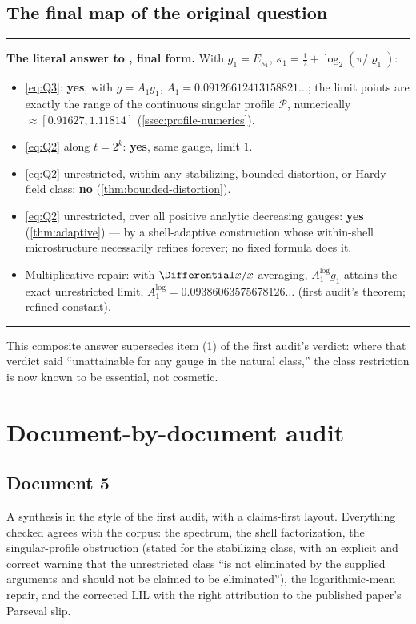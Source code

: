\documentclass[11pt,oneside]{article}
\theoremstyle{definition}
\theoremstyle{remark}
\newenvironment{boxedremark}{%
  \par\smallskip\noindent\begin{center}\begin{minipage}{0.94\textwidth}%
  \color{black}\hrule\vspace{0.6em}\small
}{%
  \vspace{0.6em}\hrule\end{minipage}\end{center}\smallskip
}
\begin{document}
\subsection{The final map of the original question}
\label{ssec:final-map}

\begin{boxedremark}
\textbf{The literal answer to \cite{mse-decay}, final form.}
With $g_1=E_{\kappa_1}$, $\kappa_1=\frac12+\log_2(\pi/\varrho_1)$:
\begin{itemize}
\item \eqref{eq:Q3}: \textbf{yes}, with $g=A_1g_1$,
$A_1=0.09126612413158821\ldots$; the limit points are exactly the range
of the continuous singular profile $\mathscr P$,
numerically $\approx[0.91627,1.11814]$ (\cref{ssec:profile-numerics}).
\item \eqref{eq:Q2} along $t=2^k$: \textbf{yes}, same gauge, limit $1$.
\item \eqref{eq:Q2} unrestricted, within any stabilizing,
bounded-distortion, or Hardy-field class: \textbf{no}
(\cref{thm:bounded-distortion}).
\item \eqref{eq:Q2} unrestricted, over all positive analytic decreasing
gauges: \textbf{yes} (\cref{thm:adaptive}) --- by a shell-adaptive
construction whose within-shell microstructure necessarily refines
forever; no fixed formula does it.
\item Multiplicative repair: with $\Differential x/x$ averaging, $A_1^{\log}g_1$
attains the exact unrestricted limit,
$A_1^{\log}=0.09386063575678126\ldots$ (first audit's theorem; refined
constant).
\end{itemize}
\end{boxedremark}

This composite answer supersedes item (1) of the first audit's verdict:
where that verdict said ``unattainable for any gauge in the natural
class,'' the class restriction is now known to be essential, not
cosmetic.

\section{Document-by-document audit}
\label{sec:documents}

\subsection{Document 5}
\label{ssec:doc5}

A synthesis in the style of the first audit, with a claims-first layout.
Everything checked agrees with the corpus: the spectrum, the shell
factorization, the singular-profile obstruction (stated for the
stabilizing class, with an explicit and correct warning that the
unrestricted class ``is not eliminated by the supplied arguments and
should not be claimed to be eliminated''), the logarithmic-mean repair,
and the corrected LIL with the right attribution to the published
paper's Parseval slip.
\end{document}
